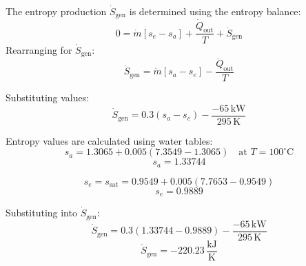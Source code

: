 The entropy production \( \dot{S}_{\text{gen}} \) is determined using the entropy balance:  
\[
0 = \dot{m} \left[ s_e - s_a \right] + \frac{\dot{Q}_{\text{out}}}{T} + \dot{S}_{\text{gen}}
\]  
Rearranging for \( \dot{S}_{\text{gen}} \):  
\[
\dot{S}_{\text{gen}} = \dot{m} \left[ s_a - s_e \right] - \frac{\dot{Q}_{\text{out}}}{T}
\]  

Substituting values:  
\[
\dot{S}_{\text{gen}} = 0.3 \left( s_a - s_e \right) - \frac{-65 \, \text{kW}}{295 \, \text{K}}
\]  

Entropy values are calculated using water tables:  
\[
s_a = 1.3065 + 0.005 \left( 7.3549 - 1.3065 \right) \quad \text{at } T = 100^\circ\text{C}
\]  
\[
s_a = 1.33744
\]  

\[
s_e = s_{\text{sat}} = 0.9549 + 0.005 \left( 7.7653 - 0.9549 \right)
\]  
\[
s_e = 0.9889
\]  

Substituting into \( \dot{S}_{\text{gen}} \):  
\[
\dot{S}_{\text{gen}} = 0.3 \left( 1.33744 - 0.9889 \right) - \frac{-65 \, \text{kW}}{295 \, \text{K}}
\]  
\[
\dot{S}_{\text{gen}} = -220.23 \, \frac{\text{kJ}}{\text{K}}
\]